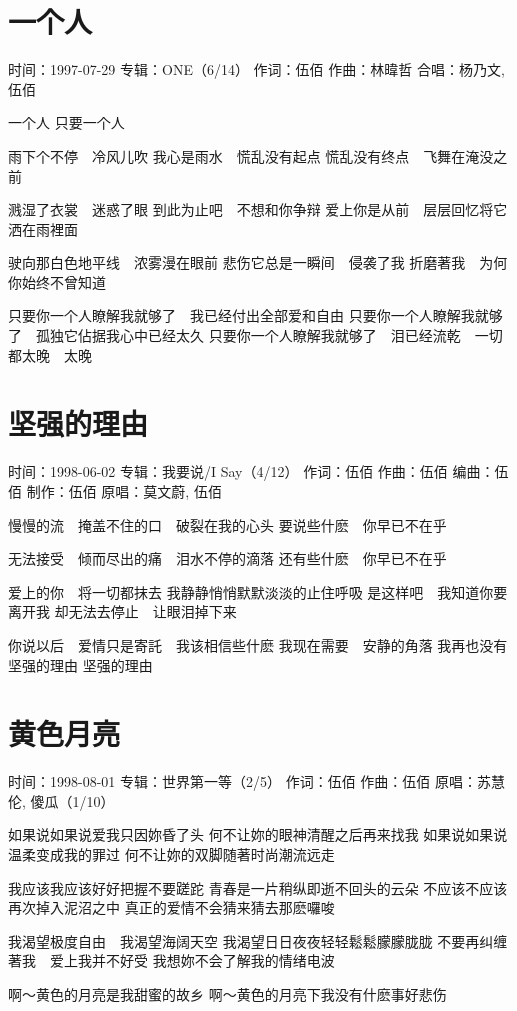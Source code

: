 \documentclass[UTF8,a4paper,oneside,twocolumn,12pt]{ctexbook}
\newcommand{\infopair}[2]{\textbullet #1：#2}
\newcommand{\zc}[1][伍佰]{\infopair{作词}{#1}}
\newcommand{\zq}[1][伍佰]{\infopair{作曲}{#1}}
\newcommand{\bq}[1][伍佰]{\infopair{编曲}{#1}}
\newcommand{\zj}[1]{\infopair{专辑}{#1}}
\newcommand{\zz}[1]{\infopair{制作}{#1}}
\newcommand{\yc}[1]{\infopair{原唱}{#1}}
\newcommand{\sj}[1]{\infopair{时间}{#1}}
\newenvironment{info}{\begin{flushleft}\kaishu
	}
	{\end{flushleft}\normalsize\yahei\par}
\newenvironment{lyric}{
	}
{}
\begin{document}
\section{一个人}
\begin{info}
	\sj{1997-07-29}
	\zj{ONE（6/14）}
	\zc
	\zq[林暐哲]
	\infopair{合唱}{杨乃文, 伍佰}
\end{info}
\begin{lyric}
	一个人 只要一个人

	雨下个不停　冷风儿吹
	我心是雨水　慌乱没有起点
	慌乱没有终点　飞舞在淹没之前

	溅湿了衣裳　迷惑了眼
	到此为止吧　不想和你争辩
	爱上你是从前　层层回忆将它洒在雨裡面

	驶向那白色地平线　浓雾漫在眼前
	悲伤它总是一瞬间　侵袭了我
	折磨著我　为何你始终不曾知道

	只要你一个人瞭解我就够了　我已经付出全部爱和自由
	只要你一个人瞭解我就够了　孤独它佔据我心中已经太久
	只要你一个人瞭解我就够了　泪已经流乾　一切都太晚　太晚
\end{lyric}

\section{坚强的理由}
\begin{info}
	\sj{1998-06-02}
	\zj{我要说/I Say（4/12）}
	\zc
	\zq
	\bq[伍佰]
	\zz{伍佰}
	\infopair{原唱}{莫文蔚, 伍佰}
\end{info}
\begin{lyric}
	慢慢的流　掩盖不住的口　破裂在我的心头
	要说些什麽　你早已不在乎

	无法接受　倾而尽出的痛　泪水不停的滴落
	还有些什麽　你早已不在乎

	爱上的你　将一切都抹去
	我静静悄悄默默淡淡的止住呼吸
	是这样吧　我知道你要离开我
	却无法去停止　让眼泪掉下来

	你说以后　爱情只是寄託　我该相信些什麽
	我现在需要　安静的角落
	我再也没有　坚强的理由
	坚强的理由
\end{lyric}

\section{黄色月亮}
\begin{info}
	\sj{1998-08-01}
	\zj{世界第一等（2/5）}
	\zc
	\zq
	\yc{苏慧伦, 傻瓜（1/10）}
\end{info}
\begin{lyric}
	如果说如果说爱我只因妳昏了头  何不让妳的眼神清醒之后再来找我
	如果说如果说温柔变成我的罪过  何不让妳的双脚随著时尚潮流远走

	我应该我应该好好把握不要蹉跎  青春是一片稍纵即逝不回头的云朵
	不应该不应该再次掉入泥沼之中  真正的爱情不会猜来猜去那麽囉唆

	我渴望极度自由　我渴望海阔天空  我渴望日日夜夜轻轻鬆鬆朦朦胧胧
	不要再纠缠著我　爱上我并不好受  我想妳不会了解我的情绪电波

	啊～黄色的月亮是我甜蜜的故乡  啊～黄色的月亮下我没有什麽事好悲伤
\end{lyric}
\end{document}

